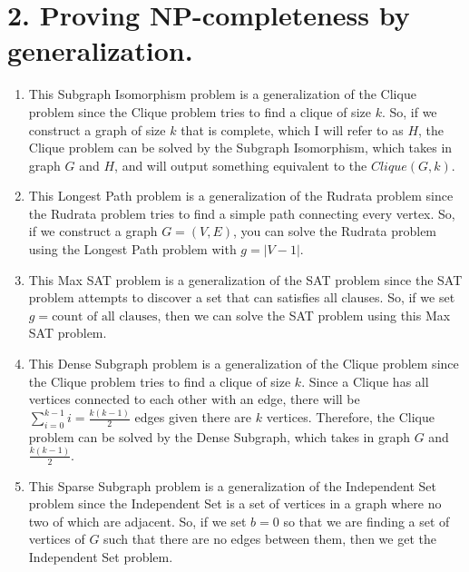 \documentclass[11pt]{article}
\begin{document}
\newpage
\section*{2. Proving \textbf{NP}-completeness by generalization.}
\begin{enumerate}[label=(\alph*)]
\item
This Subgraph Isomorphism problem is a generalization of the Clique problem since the Clique problem tries to find a clique of size $k$. So, if we construct a graph of size $k$ that is complete, which I will refer to as $H$, the Clique problem can be solved by the Subgraph Isomorphism, which takes in graph $G$ and $H$, and will output something equivalent to the $Clique(G, k)$.



\item
This Longest Path problem is a generalization of the Rudrata problem since the Rudrata problem tries to find a simple path connecting every vertex. So, if we construct a graph $G = (V, E)$, you can solve the Rudrata problem using the Longest Path problem with $g = |V - 1|$.



\item
This Max SAT problem is a generalization of the SAT problem since the SAT problem attempts to discover a set that can satisfies all clauses. So, if we set $g = \text{count of all clauses}$, then we can solve the SAT problem using this Max SAT problem.



\item
This Dense Subgraph problem is a generalization of the Clique problem since the Clique problem tries to find a clique of size $k$. Since a Clique has all vertices connected to each other with an edge, there will be $\sum_{i = 0}^{k - 1} i = \frac{k (k - 1)} {2}$ edges given there are $k$ vertices. Therefore, the Clique problem can be solved by the Dense Subgraph, which takes in graph $G$ and $\frac{k (k - 1)} {2}$.



\item
This Sparse Subgraph problem is a generalization of the Independent Set problem since the Independent Set is a set of vertices in a graph where no two of which are adjacent. So, if we set $b = 0$ so that we are finding a set of vertices of $G$ such that there are no edges between them, then we get the Independent Set problem.
\end{enumerate}
\end{document}
